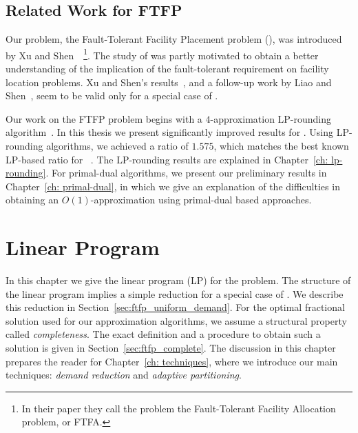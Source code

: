 \documentclass[oneside,final]{ucr}
\begin{document}
\section{Related Work for FTFP}
Our problem, the Fault-Tolerant Facility Placement problem
(\FTFP), was introduced by Xu and
Shen~\cite{XuS09}~\footnote{In their paper they call the
  problem the Fault-Tolerant Facility Allocation problem, or
  FTFA.}. The study of {\FTFP} was partly motivated to
obtain a better understanding of the implication of the
fault-tolerant requirement on facility location problems.
Xu and Shen's results~\cite{XuS09}, and a follow-up work by
Liao and Shen~\cite{LiaoS11}, seem to be valid only for a
special case of {\FTFP}.

Our work on the FTFP problem begins with a $4$-approximation
LP-rounding algorithm~\cite{YanC11}. In this thesis we
present significantly improved results for {\FTFP}. Using
LP-rounding algorithms, we achieved a ratio of $1.575$,
which matches the best known LP-based ratio for
{\UFL}~\cite{ByrkaGS10}. The LP-rounding results are
explained in Chapter~\ref{ch: lp-rounding}. For primal-dual
algorithms, we present our preliminary results in
Chapter~\ref{ch: primal-dual}, in which we give an
explanation of the difficulties in obtaining an
$O(1)$-approximation using primal-dual based approaches.


\chapter{Linear Program} \label{ch: lp} 

In this chapter we give the linear program (LP) for the
{\FTFP} problem. The structure of the linear program implies
a simple reduction for a special case of {\FTFP}. We
describe this reduction in
Section~\ref{sec:ftfp_uniform_demand}. For the optimal
fractional solution used for our approximation algorithms,
we assume a structural property called
\emph{completeness}. The exact definition and a procedure to
obtain such a solution is given in
Section~\ref{sec:ftfp_complete}. The discussion in this
chapter prepares the reader for Chapter~\ref{ch:
  techniques}, where we introduce our main techniques:
\emph{demand reduction} and \emph{adaptive partitioning}.
\end{document}
